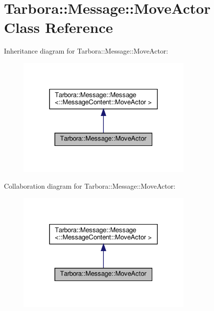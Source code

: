 \hypertarget{classTarbora_1_1Message_1_1MoveActor}{}\section{Tarbora\+:\+:Message\+:\+:Move\+Actor Class Reference}
\label{classTarbora_1_1Message_1_1MoveActor}


Inheritance diagram for Tarbora\+:\+:Message\+:\+:Move\+Actor\+:\nopagebreak
\begin{figure}[H]
\begin{center}
\leavevmode
\includegraphics[width=245pt]{classTarbora_1_1Message_1_1MoveActor__inherit__graph}
\end{center}
\end{figure}


Collaboration diagram for Tarbora\+:\+:Message\+:\+:Move\+Actor\+:\nopagebreak
\begin{figure}[H]
\begin{center}
\leavevmode
\includegraphics[width=245pt]{classTarbora_1_1Message_1_1MoveActor__coll__graph}
\end{center}
\end{figure}
